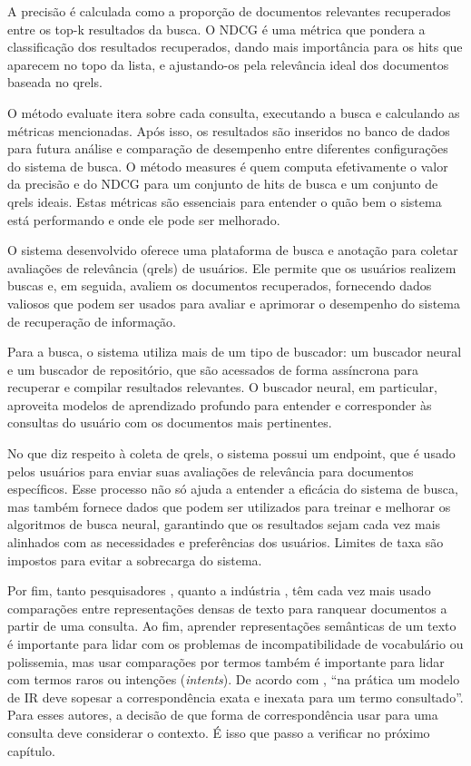 \documentclass[
	12pt,				%
	openright,			%
	oneside,			%
	a4paper,			%
	english,			%
	french,				%
	spanish,			%
	brazil				%
	]{abntex2}
\begin{document}
A precisão é calculada como a proporção de documentos relevantes recuperados entre os top-k resultados da busca. O NDCG é uma métrica que pondera a classificação dos resultados recuperados, dando mais importância para os hits que aparecem no topo da lista, e ajustando-os pela relevância ideal dos documentos baseada no qrels.

O método evaluate itera sobre cada consulta, executando a busca e calculando as métricas mencionadas. Após isso, os resultados são inseridos no banco de dados para futura análise e comparação de desempenho entre diferentes configurações do sistema de busca. O método measures é quem computa efetivamente o valor da precisão e do NDCG para um conjunto de hits de busca e um conjunto de qrels ideais. Estas métricas são essenciais para entender o quão bem o sistema está performando e onde ele pode ser melhorado.

O sistema desenvolvido oferece uma plataforma de busca e anotação para coletar avaliações de relevância (qrels) de usuários. Ele permite que os usuários realizem buscas e, em seguida, avaliem os documentos recuperados, fornecendo dados valiosos que podem ser usados para avaliar e aprimorar o desempenho do sistema de recuperação de informação.

Para a busca, o sistema utiliza mais de um tipo de buscador: um buscador neural e um buscador de repositório, que são acessados de forma assíncrona para recuperar e compilar resultados relevantes. O buscador neural, em particular, aproveita modelos de aprendizado profundo para entender e corresponder às consultas do usuário com os documentos mais pertinentes.

No que diz respeito à coleta de qrels, o sistema possui um endpoint, que é usado pelos usuários para enviar suas avaliações de relevância para documentos específicos. Esse processo não só ajuda a entender a eficácia do sistema de busca, mas também fornece dados que podem ser utilizados para treinar e melhorar os algoritmos de busca neural, garantindo que os resultados sejam cada vez mais alinhados com as necessidades e preferências dos usuários. Limites de taxa são impostos para evitar a sobrecarga do sistema.

Por fim,
tanto pesquisadores \cite{}, quanto a indústria \cite{}, têm cada vez mais usado comparações entre representações densas de texto para ranquear documentos a partir de uma consulta.
Ao fim, aprender representações semânticas de um texto é importante para lidar com os problemas de incompatibilidade de vocabulário ou polissemia, mas usar comparações por termos também é importante para lidar com termos raros ou intenções (\textit{intents}). \cite{bhaskar-craswell-2018}
De acordo com \citeauthor{bhaskar-craswell-2018}, ``na prática um modelo de IR deve sopesar a correspondência exata e inexata para um termo consultado''. Para esses autores, a decisão de que forma de correspondência usar para uma consulta deve considerar o contexto.
É isso que passo a verificar no próximo capítulo.
\end{document}
